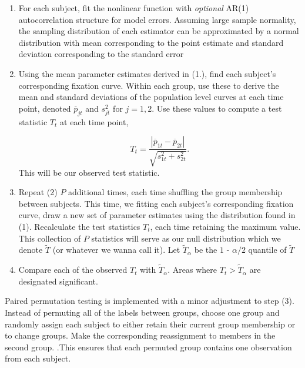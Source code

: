 \documentclass{article}
\begin{document}
\begin{singlespace}
\begin{enumerate}
\vspace{-2mm}
\item For each subject, fit the nonlinear function with \textit{optional} AR(1) autocorrelation structure for model errors. Assuming large sample normality, the sampling distribution of each estimator can be approximated by a normal distribution with mean corresponding to the point estimate and standard deviation corresponding to the standard error
\item Using the mean parameter estimates derived in (1.), find each subject's corresponding fixation curve. Within each group, use these to derive the mean and standard deviations of the population level curves at each time point, denoted $\overline{p}_{jt}$ and $s_{jt}^2$ for $j = 1,2$. Use these values to compute a test statistic $T_t$ at each time point,

\begin{equation}
T_t = \frac{|\overline{p}_{1t} - \overline{p}_{2t}|}{\sqrt{s_{1t}^2 + s_{2t}^2}}.
\end{equation}
This will be our observed test statistic.
\item Repeat (2) $P$  additional times, each time shuffling the group membership between subjects. This time, we fitting each subject's corresponding fixation curve, draw a new set of parameter estimates using the distribution found in (1). Recalculate the test statistics $T_t$, each time retaining the maximum value. This collection of $P$ statistics will serve as our null distribution which we denote $\widetilde{T}$ (or whatever we wanna call it). Let $\widetilde{T}_{\alpha}$ be the $1$ - $\alpha/2$ quantile of $\widetilde{T}$
\item Compare each of the observed $T_t$ with $\widetilde{T}_{\alpha}$. Areas where $T_t > \widetilde{T}_{\alpha}$ are designated significant. 
\end{enumerate}
\end{singlespace}

Paired permutation testing is implemented with a minor adjustment to step (3). Instead of permuting all of the labels between groups, choose one group and randomly assign each subject to either retain their current group membership or to change groups. Make the corresponding reassignment to members in the second group. .This ensures that each permuted group contains one observation from each subject.
\end{document}
